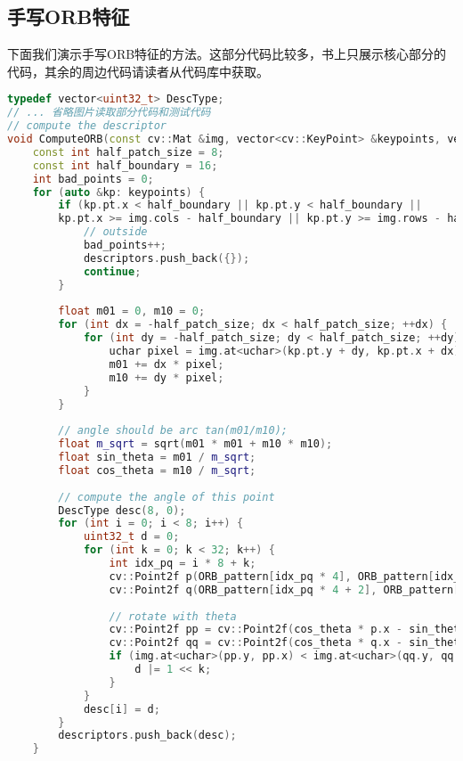\subsection{手写ORB特征}
下面我们演示手写ORB特征的方法。这部分代码比较多，书上只展示核心部分的代码，其余的周边代码请读者从代码库中获取。
\begin{lstlisting}[language=c++,caption=slambook2/ch7/orb_self.cpp（片段）]
typedef vector<uint32_t> DescType;
// ... 省略图片读取部分代码和测试代码
// compute the descriptor
void ComputeORB(const cv::Mat &img, vector<cv::KeyPoint> &keypoints, vector<DescType> &descriptors) {
    const int half_patch_size = 8;
    const int half_boundary = 16;
    int bad_points = 0;
    for (auto &kp: keypoints) {
        if (kp.pt.x < half_boundary || kp.pt.y < half_boundary ||
        kp.pt.x >= img.cols - half_boundary || kp.pt.y >= img.rows - half_boundary) {
            // outside
            bad_points++;
            descriptors.push_back({});
            continue;
        }
    
        float m01 = 0, m10 = 0;
        for (int dx = -half_patch_size; dx < half_patch_size; ++dx) {
            for (int dy = -half_patch_size; dy < half_patch_size; ++dy) {
                uchar pixel = img.at<uchar>(kp.pt.y + dy, kp.pt.x + dx);
                m01 += dx * pixel;
                m10 += dy * pixel;
            }
        }
    
        // angle should be arc tan(m01/m10);
        float m_sqrt = sqrt(m01 * m01 + m10 * m10);
        float sin_theta = m01 / m_sqrt;
        float cos_theta = m10 / m_sqrt;
        
        // compute the angle of this point
        DescType desc(8, 0);
        for (int i = 0; i < 8; i++) {
            uint32_t d = 0;
            for (int k = 0; k < 32; k++) {
                int idx_pq = i * 8 + k;
                cv::Point2f p(ORB_pattern[idx_pq * 4], ORB_pattern[idx_pq * 4 + 1]);
                cv::Point2f q(ORB_pattern[idx_pq * 4 + 2], ORB_pattern[idx_pq * 4 + 3]);
        
                // rotate with theta
                cv::Point2f pp = cv::Point2f(cos_theta * p.x - sin_theta * p.y, sin_theta * p.x + cos_theta * p.y) + kp.pt;
                cv::Point2f qq = cv::Point2f(cos_theta * q.x - sin_theta * q.y, sin_theta * q.x + cos_theta * q.y) + kp.pt;
                if (img.at<uchar>(pp.y, pp.x) < img.at<uchar>(qq.y, qq.x)) {
                    d |= 1 << k;
                }
            }
            desc[i] = d;
        }
        descriptors.push_back(desc);
    }
    

\end{lstlisting}

